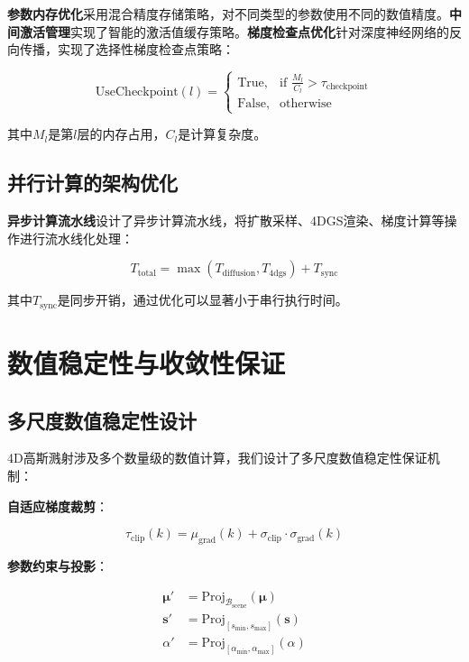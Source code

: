 \textbf{参数内存优化}采用混合精度存储策略，对不同类型的参数使用不同的数值精度。\textbf{中间激活管理}实现了智能的激活值缓存策略。\textbf{梯度检查点优化}针对深度神经网络的反向传播，实现了选择性梯度检查点策略：

\begin{equation}
\text{UseCheckpoint}(l) = \begin{cases}
\text{True}, & \text{if } \frac{M_l}{C_l} > \tau_{\text{checkpoint}} \\
\text{False}, & \text{otherwise}
\end{cases}
\label{eq:selective_checkpointing}
\end{equation}

其中$M_l$是第$l$层的内存占用，$C_l$是计算复杂度。

\subsection{并行计算的架构优化}

\textbf{异步计算流水线}设计了异步计算流水线，将扩散采样、4DGS渲染、梯度计算等操作进行流水线化处理：

\begin{equation}
T_{\text{total}} = \max(T_{\text{diffusion}}, T_{\text{4dgs}}) + T_{\text{sync}}
\label{eq:pipeline_timing}
\end{equation}

其中$T_{\text{sync}}$是同步开销，通过优化可以显著小于串行执行时间。

\section{数值稳定性与收敛性保证}

\subsection{多尺度数值稳定性设计}

4D高斯溅射涉及多个数量级的数值计算，我们设计了多尺度数值稳定性保证机制：

\textbf{自适应梯度裁剪}：

\begin{equation}
\tau_{\text{clip}}(k) = \mu_{\text{grad}}(k) + \sigma_{\text{clip}} \cdot \sigma_{\text{grad}}(k)
\label{eq:adaptive_gradient_clipping}
\end{equation}

\textbf{参数约束与投影}：

\begin{align}
\boldsymbol{\mu}' &= \text{Proj}_{\mathcal{B}_{\text{scene}}}(\boldsymbol{\mu}) \\
\mathbf{s}' &= \text{Proj}_{[s_{\min}, s_{\max}]}(\mathbf{s}) \\
\alpha' &= \text{Proj}_{[\alpha_{\min}, \alpha_{\max}]}(\alpha)
\label{eq:parameter_projection}
\end{align}

